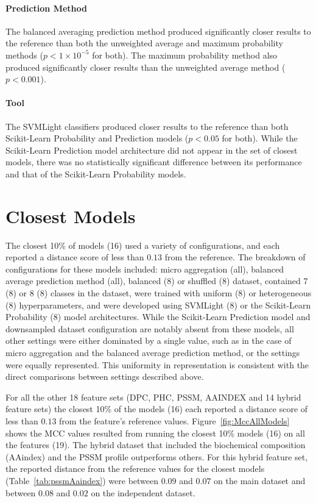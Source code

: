\paragraph{Prediction Method}
The balanced averaging prediction method produced significantly closer results to the reference than both the
unweighted average and maximum probability methods ($p < 1\times 10^{-5}$ for both). The maximum probability method
also produced significantly closer results than the unweighted average method ($p < 0.001$).

\paragraph{Tool}
The SVMLight classifiers produced closer results to the reference than both Scikit-Learn Probability and Prediction models
($p < 0.05$ for both). While the Scikit-Learn Prediction model architecture did not appear in the set of closest models,
there was no statistically significant difference between its performance and that of the Scikit-Learn Probability models.

\section{Closest Models}
The closest 10\% of models (16) used a variety of configurations, and each reported a distance score of less than
$0.13$ from the reference. The breakdown of configurations for these models included: micro aggregation (all), balanced
average prediction method (all), balanced (8) or shuffled (8) dataset, contained 7 (8) or 8 (8) classes in the dataset,
were trained with uniform (8) or heterogeneous (8) hyperparameters, and were developed using SVMLight (8) or the
Scikit-Learn Probability (8) model architectures. While the Scikit-Learn Prediction model and downsampled dataset configuration
are notably absent from these models, all other settings were either dominated by a single value, such as in the case
of micro aggregation and the balanced average prediction method, or the settings were equally represented. This
uniformity in representation is consistent with the direct comparisons between settings described above.

For all the other 18 feature sets (DPC, PHC, PSSM, AAINDEX and 14 hybrid feature sets) the closest 10\% of the models (16) 
each reported a distance score of less than $0.13$ from the feature's reference values. 
Figure~\ref{fig:MccAllModels} shows the MCC values resulted from running 
the closest 10\% models (16) on all the features (19). 
The hybrid dataset that included the biochemical composition (AAindex) and the PSSM profile 
outperforms others. For this hybrid feature set, the reported distance from the reference values 
for the closest models (Table~\ref{tab:pssmAaindex}) 
were between $0.09$ and $0.07$ on the main dataset and between $0.08$ and $0.02$ on the independent dataset.

